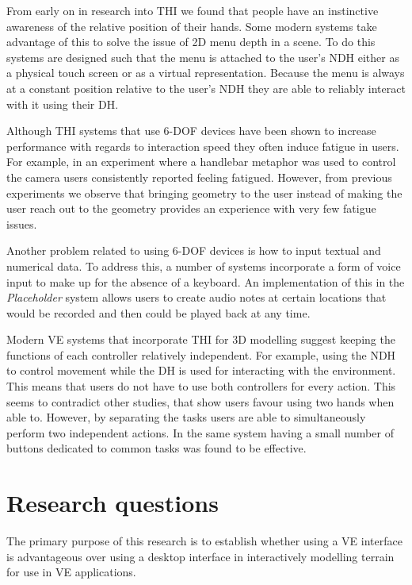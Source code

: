 \documentclass{sig-alternate-05-2015}
\begin{document}
From early on in research into THI we found that people have an instinctive awareness of the relative position of their hands\cite{Bowman1998, Buxton1986}. Some modern systems take advantage of this to solve the issue of 2D menu depth in a scene. To do this systems are designed such that the menu is attached to the user's NDH either as a physical touch screen\cite{Wang2013,Mine2014} or as a virtual representation\cite{Jerald2013}. Because the menu is always at a constant position relative to the user's NDH they are able to reliably interact with it using their DH.

Although THI systems that use 6-DOF devices have been shown to increase performance with regards to interaction speed\cite{Schultheis2012} they often induce fatigue in users. For example, in an experiment where a handlebar metaphor was used to control the camera users consistently reported feeling fatigued\cite{Song2012}. However, from previous experiments we observe that bringing geometry to the user instead of making the user reach out to the geometry provides an experience with very few fatigue issues\cite{Jerald2013}.

Another problem related to using 6-DOF devices is how to input textual and numerical data. To address this, a number of systems incorporate a form of voice input to make up for the absence of a keyboard\cite{Ponto2013,Toma2012}. An implementation of this in the \textit{Placeholder} system\cite{Laurel1994} allows users to create audio notes at certain locations that would be recorded and then could be played back at any time.

Modern VE systems that incorporate THI for 3D modelling suggest keeping the functions of each controller relatively independent\cite{Mine2014}. For example, using the NDH to control movement while the DH is used for interacting with the environment. This means that users do not have to use both controllers for every action. This seems to contradict other studies, that show users favour using two hands when able to\cite{Buxton1986,Hinckley1994}. However, by separating the tasks  users are able to simultaneously perform two independent actions.  In the same system having a small number of buttons dedicated to common tasks was found to be effective\cite{Mine2014}.


\section{Research questions}
The primary purpose of this research is to establish whether using a VE interface is advantageous over using a desktop interface in interactively modelling terrain for use in VE applications.
\end{document}
